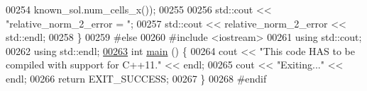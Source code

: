 \begin{DoxyCode}
00254                                     known\_sol.num\_cells\_x());
00255 
00256   std::cout << \textcolor{stringliteral}{"relative\_norm\_2\_error = "};
00257   std::cout << relative\_norm\_2\_error << std::endl;
00258 \}
00259 \textcolor{preprocessor}{#else}
00260 \textcolor{preprocessor}{#include <iostream>}
00261 \textcolor{keyword}{using} std::cout;
00262 \textcolor{keyword}{using} std::endl;
\hypertarget{poisson__1d_8cc_source_l00263}{}\hyperlink{poisson__1d_8cc_ae66f6b31b5ad750f1fe042a706a4e3d4}{00263} \textcolor{keywordtype}{int} \hyperlink{poisson__1d_8cc_ae66f6b31b5ad750f1fe042a706a4e3d4}{main} () \{
00264   cout << \textcolor{stringliteral}{"This code HAS to be compiled with support for C++11."} << endl;
00265   cout << \textcolor{stringliteral}{"Exiting..."} << endl;
00266   \textcolor{keywordflow}{return} EXIT\_SUCCESS;
00267 \}
00268 \textcolor{preprocessor}{#endif}
\end{DoxyCode}
